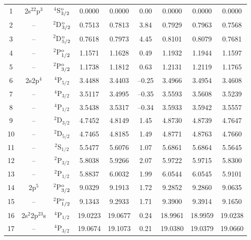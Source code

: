 \begin{table}[hbt]
\begin{center}
\begin{tabular}{@{} l *4c c *3c @{}}
       \multicolumn{1}{c}{1} & 2s$^22$p$^3$ & $^4$S$^{\rm o}_{3/2}$ & 0.0000 & 0.0000 & 0.00 & 0.0000 & 0.0000 & 0.0000\\
       \multicolumn{1}{c}{2} & -- & $^2$D$^{\rm o}_{3/2}$ & 0.7513 & 0.7813 & 3.84 & 0.7929 & 0.7963 & 0.7568\\
       \multicolumn{1}{c}{3} & -- & $^2$D$^{\rm o}_{5/2}$ & 0.7618 & 0.7973 & 4.45 & 0.8101 & 0.8079 & 0.7681\\
       \multicolumn{1}{c}{4} & -- & $^2$P$^{\rm o}_{1/2}$ & 1.1571 & 1.1628 & 0.49 & 1.1932 & 1.1944 & 1.1597\\
       \multicolumn{1}{c}{5} & -- & $^2$P$^{\rm o}_{3/2}$ & 1.1738 & 1.1812 & 0.63 & 1.2131 & 1.2119 & 1.1765\\
       \multicolumn{1}{c}{6} & 2s2p$^4$ & $^4$P$_{5/2}$ & 3.4488 & 3.4403 & --0.25 & 3.4966 & 3.4954 & 3.4608\\
       \multicolumn{1}{c}{7} & -- & $^4$P$_{3/2}$ & 3.5117 & 3.4995 & --0.35 & 3.5593 & 3.5608 & 3.5239\\
       \multicolumn{1}{c}{8} & -- & $^4$P$_{1/2}$ & 3.5438 & 3.5317 & --0.34 & 3.5933 & 3.5942 & 3.5557\\
       \multicolumn{1}{c}{9} & -- & $^2$D$_{3/2}$ & 4.7452 & 4.8149 & 1.45 & 4.8730 & 4.8739 & 4.7647\\
       \multicolumn{1}{c}{10} & -- & $^2$D$_{5/2}$ & 4.7465 & 4.8185 & 1.49 & 4.8771 & 4.8763 & 4.7660\\
       \multicolumn{1}{c}{11} & -- & $^2$S$_{1/2}$ & 5.5477 & 5.6076 & 1.07 & 5.6861 & 5.6864 & 5.5645\\
       \multicolumn{1}{c}{12} & -- & $^2$P$_{3/2}$ & 5.8038 & 5.9266 & 2.07 & 5.9722 & 5.9715 & 5.8300\\
       \multicolumn{1}{c}{13} & -- & $^2$P$_{1/2}$ & 5.8837 & 6.0032 & 1.99 & 6.0544 & 6.0545 & 5.9101\\
       \multicolumn{1}{c}{14} & 2p$^5$ & $^2$P$^{\rm o}_{3/2}$ & 9.0329 & 9.1913 & 1.72 & 9.2852 & 9.2860 & 9.0635\\
       \multicolumn{1}{c}{15} & -- & $^2$P$^{\rm o}_{1/2}$ & 9.1343 & 9.2933 & 1.71 & 9.3900 & 9.3914 & 9.1650\\                                                                                           
       \multicolumn{1}{c}{16} & 2s$^2$2p$^23$s & $^4$P$_{1/2}$ & 19.0223 & 19.0677 & 0.24 & 18.9961 & 18.9959 & 19.0238\\
       \multicolumn{1}{c}{17} & -- & $^4$P$_{3/2}$ & 19.0674 & 19.1073 & 0.21 & 19.0380 & 19.0379 & 19.0660\\

\end{tabular}
\end{center}
\end{table}
